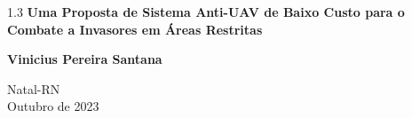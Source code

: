 \begin{titlingpage}
\begin{center}
		\vspace{6cm}
						
		{\setlength{\baselineskip}%
		{1.3\baselineskip}
		{\LARGE \textbf{Uma Proposta de Sistema Anti-UAV de Baixo Custo para o Combate a Invasores em Áreas Restritas}}}
			
		\vspace{3cm}
			
		{\large \textbf{Vinicius Pereira Santana}}
						
		\vspace{6cm}
		
	Natal-RN\\Outubro de 2023 %
	\end{center}
\end{titlingpage}